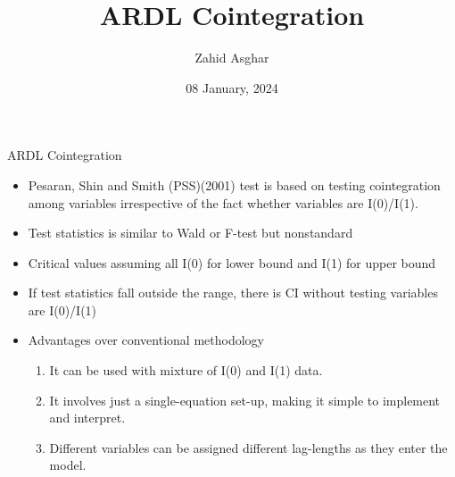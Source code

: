 \documentclass[
  ignorenonframetext,
  aspectratio=169]{beamer}
\title{ARDL Cointegration}
\author{Zahid Asghar}
\date{08 January, 2024}
\institute{School of Economics}
\begin{document}
\frame{\titlepage}

\begin{frame}{ARDL Cointegration}
\protect\hypertarget{ardl-cointegration}{}
\begin{itemize}
\item
  Pesaran, Shin and Smith (PSS)(2001) test is based on testing
  cointegration among variables irrespective of the fact whether
  variables are I(0)/I(1).
\item
  Test statistics is similar to Wald or F-test but nonstandard
\item
  Critical values assuming all I(0) for lower bound and I(1) for upper
  bound
\item
  If test statistics fall outside the range, there is CI without testing
  variables are I(0)/I(1)
\item
  Advantages over conventional methodology

  \begin{enumerate}
  \item
    It can be used with mixture of I(0) and I(1) data.
  \item
    It involves just a single-equation set-up, making it simple to
    implement and interpret.
  \item
    Different variables can be assigned different lag-lengths as they
    enter the model.
  \end{enumerate}
\end{itemize}
\end{frame}
\end{document}
